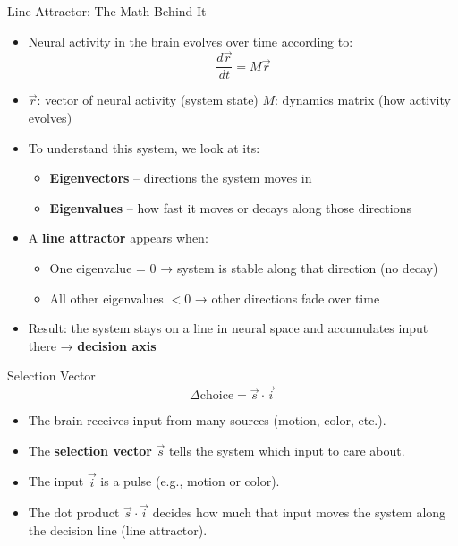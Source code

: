 \documentclass{beamer}
\begin{document}
\begin{frame}{Line Attractor: The Math Behind It}
    \begin{itemize}
        \item Neural activity in the brain evolves over time according to:
        \[
        \frac{d\vec{r}}{dt} = M \vec{r}
        \]
        \item \( \vec{r} \): vector of neural activity (system state)  
        \( M \): dynamics matrix (how activity evolves)
        \item To understand this system, we look at its:
        \begin{itemize}
            \item \textbf{Eigenvectors} – directions the system moves in
            \item \textbf{Eigenvalues} – how fast it moves or decays along those directions
        \end{itemize}
        \item A \textbf{line attractor} appears when:
        \begin{itemize}
            \item One eigenvalue = 0 → system is stable along that direction (no decay)
            \item All other eigenvalues \( < 0 \) → other directions fade over time
        \end{itemize}
        \item Result: the system stays on a line in neural space and accumulates input there → \textbf{decision axis}
    \end{itemize}
\end{frame}

\begin{frame}{Selection Vector}
    \[
    \Delta \text{choice} = \vec{s} \cdot \vec{i}
    \]
    \begin{itemize}
        \item The brain receives input from many sources (motion, color, etc.).
        \item The \textbf{selection vector} \( \vec{s} \) tells the system which input to care about.
        \item The input \( \vec{i} \) is a pulse (e.g., motion or color).
        \item The dot product \( \vec{s} \cdot \vec{i} \) decides how much that input moves the system along the decision line (line attractor).
    \end{itemize}
\end{frame}
\end{document}
